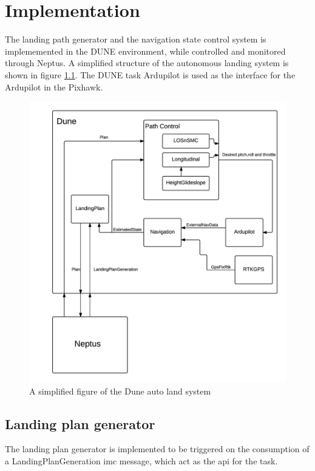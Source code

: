 \chapter{Implementation}
The landing path generator and the navigation state control system is implememented in the DUNE environment, while controlled and monitored through Neptus. A simplified structure of the autonomous landing system is shown in figure \ref{fig:DuneSystem}. The DUNE task Ardupilot is used as the interface for the Ardupilot in the Pixhawk.
\begin{figure}[H]
	\centering
		\includegraphics[scale=0.8]{figs/DUNESystem.png}
		\caption{A simplified figure of the Dune auto land system}
		\label{fig:DuneSystem}
\end{figure}
\section{Landing plan generator}
The landing plan generator is implemented to be triggered on the consumption of a LandingPlanGeneration \gls{imc} message, which act as the \gls{api} for the task.

